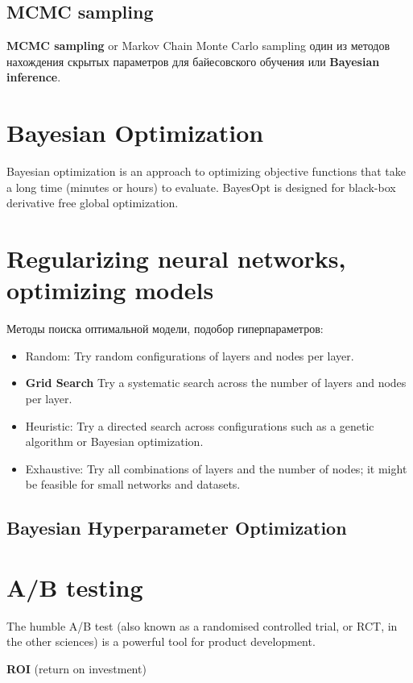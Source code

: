 \documentclass{book}
\begin{document}
\section{MCMC sampling}

\textbf{MCMC sampling} or Markov Chain Monte Carlo sampling один из методов нахождения скрытых параметров для байесовского обучения или \textbf{Bayesian
inference}.\\



\chapter{Bayesian Optimization}
Bayesian optimization is an approach to optimizing objective functions that take a long time (minutes or hours) to evaluate. BayesOpt is designed for black-box derivative free global optimization.

\chapter{Regularizing neural networks, optimizing models}
Методы поиска оптимальной модели, подобор гиперпараметров:
\begin{itemize}
\item Random: Try random configurations of layers and nodes per layer.
\item \textbf{Grid Search} Try a systematic search across the number of layers and nodes per layer.
\item Heuristic: Try a directed search across configurations such as a genetic algorithm or Bayesian optimization.
\item Exhaustive: Try all combinations of layers and the number of nodes; it might be feasible for small networks and datasets.
\end{itemize}
\section{Bayesian Hyperparameter Optimization}

\chapter{A/B testing}
The humble A/B test (also known as a randomised controlled trial, or RCT, in the other sciences) is a powerful tool for product development.

\textbf{ROI} (return on investment)
\end{document}
